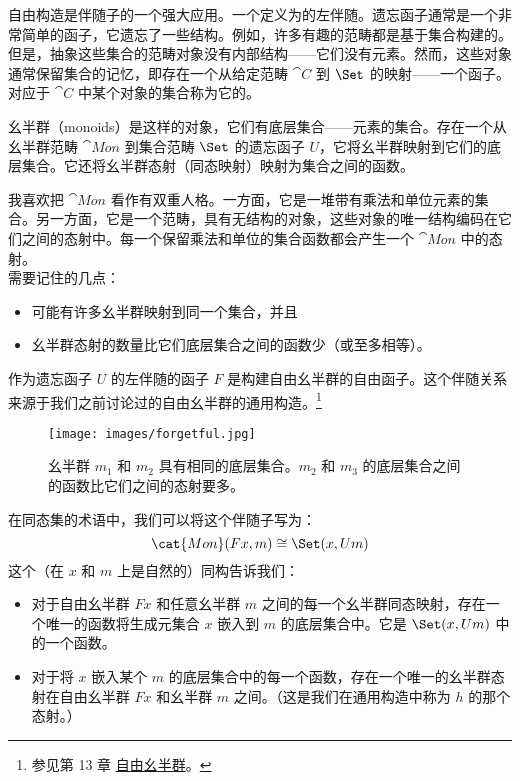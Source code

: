 
\lettrine[lhang=0.17]{自}{由构造}是伴随子的一个强大应用。一个定义为的左伴随。遗忘函子通常是一个非常简单的函子，它遗忘了一些结构。例如，许多有趣的范畴都是基于集合构建的。但是，抽象这些集合的范畴对象没有内部结构——它们没有元素。然而，这些对象通常保留集合的记忆，即存在一个从给定范畴 $\cat{C}$ 到 $\Set$ 的映射——一个函子。对应于 $\cat{C}$ 中某个对象的集合称为它的。

幺半群（monoids）是这样的对象，它们有底层集合——元素的集合。存在一个从幺半群范畴 $\cat{Mon}$ 到集合范畴 $\Set$ 的遗忘函子 $U$，它将幺半群映射到它们的底层集合。它还将幺半群态射（同态映射）映射为集合之间的函数。

我喜欢把 $\cat{Mon}$ 看作有双重人格。一方面，它是一堆带有乘法和单位元素的集合。另一方面，它是一个范畴，具有无结构的对象，这些对象的唯一结构编码在它们之间的态射中。每一个保留乘法和单位的集合函数都会产生一个 $\cat{Mon}$ 中的态射。\\
\newline
需要记住的几点：

\begin{itemize}
  \tightlist
  \item
  可能有许多幺半群映射到同一个集合，并且
  \item
  幺半群态射的数量比它们底层集合之间的函数少（或至多相等）。
\end{itemize}

\noindent
作为遗忘函子 $U$ 的左伴随的函子 $F$ 是构建自由幺半群的自由函子。这个伴随关系来源于我们之前讨论过的自由幺半群的通用构造。\footnote{参见第 13 章 \hyperref[free-monoids]{自由幺半群}。}

\begin{figure}[H]
  \centering
  \texttt{[image: images/forgetful.jpg]}
  \caption{幺半群 $m_1$ 和 $m_2$ 具有相同的底层集合。$m_2$ 和 $m_3$ 的底层集合之间的函数比它们之间的态射要多。}
\end{figure}

\noindent
在同态集的术语中，我们可以将这个伴随子写为：
\[\cat{Mon}(F x, m) \cong \Set(x, U m)\]
这个（在 $x$ 和 $m$ 上是自然的）同构告诉我们：

\begin{itemize}
  \tightlist
  \item
  对于自由幺半群 $F x$ 和任意幺半群 $m$ 之间的每一个幺半群同态映射，存在一个唯一的函数将生成元集合 $x$ 嵌入到 $m$ 的底层集合中。它是 $\Set(x, U m)$ 中的一个函数。
  \item
  对于将 $x$ 嵌入某个 $m$ 的底层集合中的每一个函数，存在一个唯一的幺半群态射在自由幺半群 $F x$ 和幺半群 $m$ 之间。（这是我们在通用构造中称为 $h$ 的那个态射。）
\end{itemize}

